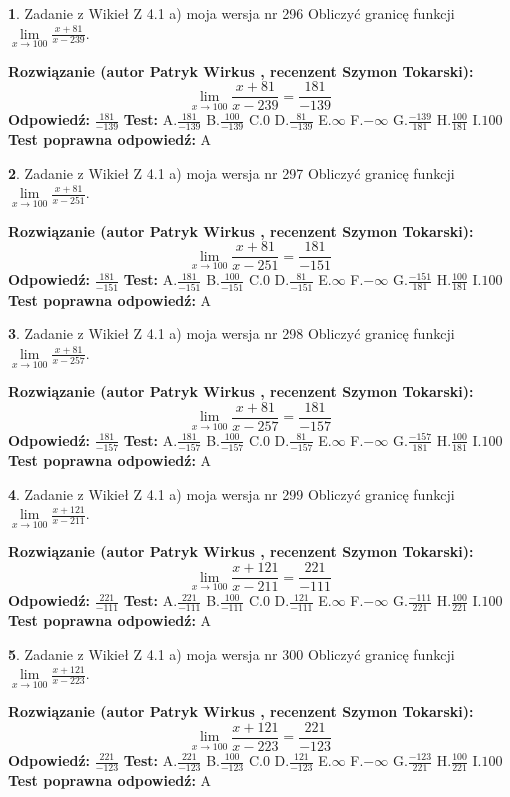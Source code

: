 \documentclass[12pt, a4paper]{article}
\theoremstyle{definition} %
\newtheorem{zad}{}
\newcommand{\zadStart}[1]{\begin{zad}#1\newline}
\newcommand{\zadStop}{\end{zad}}
\newcommand{\rozwStart}[2]{\noindent \textbf{Rozwiązanie (autor #1 , recenzent #2): }\newline}
\newcommand{\rozwStop}{\newline}
\newcommand{\odpStart}{\noindent \textbf{Odpowiedź:}\newline}
\newcommand{\odpStop}{\newline}
\newcommand{\testStart}{\noindent \textbf{Test:}\newline}
\newcommand{\testStop}{\newline}
\newcommand{\kluczStart}{\noindent \textbf{Test poprawna odpowiedź:}\newline}
\newcommand{\kluczStop}{\newline}
\begin{document}
\zadStart{Zadanie z Wikieł Z 4.1 a) moja wersja nr 296}
Obliczyć granicę funkcji $\lim\limits_{x\to100}\frac{x+81}{x-239}$.
\zadStop
\rozwStart{Patryk Wirkus}{Szymon Tokarski}
$$\lim\limits_{x\to100}\frac{x+81}{x-239} = \frac{181}{-139}$$
\rozwStop
\odpStart
$\frac{181}{-139}$
\odpStop
\testStart
A.$\frac{181}{-139}$
B.$\frac{100}{-139}$
C.$0$
D.$\frac{81}{-139}$
E.$\infty$
F.$-\infty$
G.$\frac{-139}{181}$
H.$\frac{100}{181}$
I.$100$
\testStop
\kluczStart
A
\kluczStop



\zadStart{Zadanie z Wikieł Z 4.1 a) moja wersja nr 297}
Obliczyć granicę funkcji $\lim\limits_{x\to100}\frac{x+81}{x-251}$.
\zadStop
\rozwStart{Patryk Wirkus}{Szymon Tokarski}
$$\lim\limits_{x\to100}\frac{x+81}{x-251} = \frac{181}{-151}$$
\rozwStop
\odpStart
$\frac{181}{-151}$
\odpStop
\testStart
A.$\frac{181}{-151}$
B.$\frac{100}{-151}$
C.$0$
D.$\frac{81}{-151}$
E.$\infty$
F.$-\infty$
G.$\frac{-151}{181}$
H.$\frac{100}{181}$
I.$100$
\testStop
\kluczStart
A
\kluczStop



\zadStart{Zadanie z Wikieł Z 4.1 a) moja wersja nr 298}
Obliczyć granicę funkcji $\lim\limits_{x\to100}\frac{x+81}{x-257}$.
\zadStop
\rozwStart{Patryk Wirkus}{Szymon Tokarski}
$$\lim\limits_{x\to100}\frac{x+81}{x-257} = \frac{181}{-157}$$
\rozwStop
\odpStart
$\frac{181}{-157}$
\odpStop
\testStart
A.$\frac{181}{-157}$
B.$\frac{100}{-157}$
C.$0$
D.$\frac{81}{-157}$
E.$\infty$
F.$-\infty$
G.$\frac{-157}{181}$
H.$\frac{100}{181}$
I.$100$
\testStop
\kluczStart
A
\kluczStop



\zadStart{Zadanie z Wikieł Z 4.1 a) moja wersja nr 299}
Obliczyć granicę funkcji $\lim\limits_{x\to100}\frac{x+121}{x-211}$.
\zadStop
\rozwStart{Patryk Wirkus}{Szymon Tokarski}
$$\lim\limits_{x\to100}\frac{x+121}{x-211} = \frac{221}{-111}$$
\rozwStop
\odpStart
$\frac{221}{-111}$
\odpStop
\testStart
A.$\frac{221}{-111}$
B.$\frac{100}{-111}$
C.$0$
D.$\frac{121}{-111}$
E.$\infty$
F.$-\infty$
G.$\frac{-111}{221}$
H.$\frac{100}{221}$
I.$100$
\testStop
\kluczStart
A
\kluczStop



\zadStart{Zadanie z Wikieł Z 4.1 a) moja wersja nr 300}
Obliczyć granicę funkcji $\lim\limits_{x\to100}\frac{x+121}{x-223}$.
\zadStop
\rozwStart{Patryk Wirkus}{Szymon Tokarski}
$$\lim\limits_{x\to100}\frac{x+121}{x-223} = \frac{221}{-123}$$
\rozwStop
\odpStart
$\frac{221}{-123}$
\odpStop
\testStart
A.$\frac{221}{-123}$
B.$\frac{100}{-123}$
C.$0$
D.$\frac{121}{-123}$
E.$\infty$
F.$-\infty$
G.$\frac{-123}{221}$
H.$\frac{100}{221}$
I.$100$
\testStop
\kluczStart
A
\kluczStop
\end{document}
